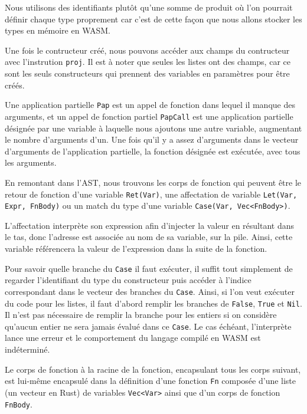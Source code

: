 \documentclass{rapportECL}
\begin{document}
Nous utilisons des identifiants plutôt qu'une somme de produit où l'on pourrait définir chaque type proprement car 
c'est de cette façon que nous allons stocker les types en mémoire en WASM.

Une fois le contructeur créé, nous pouvons accéder aux champs du contructeur avec l'instrution \verb|proj|.
Il est à noter que seules les listes ont des champs, car ce sont les seuls constructeurs qui prennent
des variables en paramètres pour être créés.

\medskip

Une application partielle \verb|Pap| est un appel de fonction dans lequel il manque des arguments, 
et un appel de fonction partiel \verb|PapCall| est une application partielle désignée par une variable
à laquelle nous ajoutons une autre variable, augmentant le nombre d'arguments d'un. 
Une fois qu'il y a assez d'arguments dans le vecteur d'arguments de l'application partielle,
la fonction désignée est exécutée, avec tous les arguments.

\bigskip

En remontant dans l'AST, nous trouvons les corps de fonction qui peuvent être le retour de fonction d'une variable \verb|Ret(Var)|, 
une affectation de variable \verb|Let(Var, Expr, FnBody)| ou un match du type d'une variable 
\verb|Case(Var, Vec<FnBody>)|.

\medskip

L'affectation interprète son expression afin d'injecter la valeur en résultant dans le tas, donc l'adresse est associée
au nom de sa variable, sur la pile. Ainsi, cette variable référencera la valeur de l'expression
dans la suite de la fonction.

\medskip

Pour savoir quelle branche du \verb|Case| il faut exécuter, il suffit tout simplement de regarder
l'identifiant du type du constructeur puis accéder à l'indice correspondant dans le vecteur des branches du \verb|Case|. 
Ainsi, si l'on veut exécuter du code pour les listes, il faut d'abord remplir les branches de \verb|False|, 
\verb|True| et \verb|Nil|. Il n'est pas nécessaire de remplir la branche pour les entiers si on considère qu'aucun entier
ne sera jamais évalué dans ce \verb|Case|. Le cas échéant, l'interprète lance une erreur et le comportement
du langage compilé en WASM est indéterminé.

\medskip

Le corps de fonction à la racine de la fonction, encapsulant tous les corps suivant, 
est lui-même encapsulé dans la définition d'une fonction \verb|Fn| composée d'une liste (un vecteur en Rust) de variables \verb|Vec<Var>| ainsi que
d'un corps de fonction \verb|FnBody|.
\end{document}
